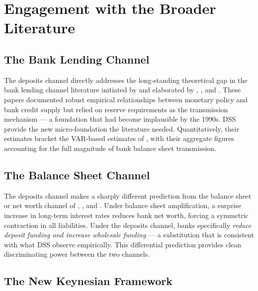 \documentclass[12pt,a4paper]{article}
\begin{document}
\section{Engagement with the Broader Literature}
\label{sec:literature}

\subsection{The Bank Lending Channel}

The deposits channel directly addresses the long-standing theoretical gap in
the bank lending channel literature initiated by \citet{bernanke_blinder_1988}
and elaborated by \citet{kashyap_stein_1994}, \citet{kashyap_stein_wilcox_1993},
and \citet{kashyap_stein_2000}. These papers documented robust empirical
relationships between monetary policy and bank credit supply but relied on
reserve requirements as the transmission mechanism --- a foundation that had
become implausible by the 1990s. DSS provide the new micro-foundation the
literature needed. Quantitatively, their estimates bracket the VAR-based
estimates of \citet{bernanke_blinder_1992}, with their aggregate figures
accounting for the full magnitude of bank balance sheet transmission.

\subsection{The Balance Sheet Channel}

The deposits channel makes a sharply different prediction from the balance
sheet or net worth channel of \citet{bernanke_gertler_1989},
\citet{kiyotaki_moore_1997}, and \citet{brunnermeier_sannikov_2014}. Under
balance sheet amplification, a surprise increase in long-term interest rates
reduces bank net worth, forcing a symmetric contraction in all liabilities.
Under the deposits channel, banks specifically \emph{reduce deposit funding
and increase wholesale funding} --- a substitution that is consistent with
what DSS observe empirically. This differential prediction provides clean
discriminating power between the two channels.

\subsection{The New Keynesian Framework}
\end{document}
